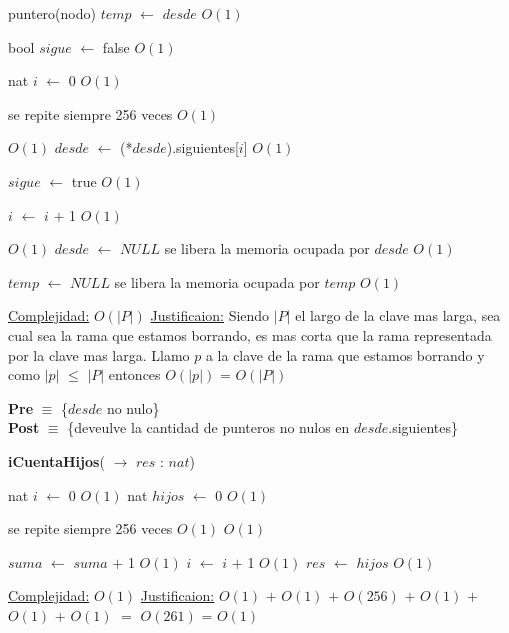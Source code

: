 \begin{Algoritmos}
\begin{algorithm}[H]
\begin{algorithmic}[1]
	\State puntero(nodo) $temp$ $\gets$ $desde$ \Comment $O(1)$

	\State bool $sigue$ $\gets$ false \Comment $O(1)$

	\State nat $i$ $\gets$ 0 \State $O(1)$

	 \Comment se repite siempre 256 veces $O(1)$

		 \Comment $O(1)$
			\State $desde$ $\gets$ (*$desde$).siguientes[$i$] \Comment $O(1)$		
		
			\State $sigue$ $\gets$ true \Comment $O(1)$		
		
		\EndIf
		\State $i$ $\gets$ $i$ $+$ 1 \Comment $O(1)$

	\EndWhile

\EndWhile

 \Comment $O(1)$
	\State $desde$ $\gets$ $NULL$ \Comment se libera la memoria ocupada por $desde$ $O(1)$

\EndIf

\State $temp$ $\gets$ $NULL$ \Comment se libera la memoria ocupada por $temp$ $O(1)$


\medskip
\State \underline{Complejidad:} $O(|P|)$
\State \underline{Justificaion:} Siendo $|P|$ el largo de la clave mas larga, sea cual sea la rama que estamos borrando, es mas corta que la rama representada por la clave mas larga. Llamo $p$ a la clave de la rama que estamos borrando y como $|p|$ $\leq$ $|P|$ entonces $O(|p|)$ = $O(|P|)$ 

\end{algorithmic}
\end{algorithm}
  
 

\textbf{Pre} $\equiv$ \{$desde$ no nulo\}\\%
\textbf{Post} $\equiv$ \{deveulve la cantidad de punteros no nulos en $desde$.siguientes\}%

\begin{algorithm}[H]
{\textbf{iCuentaHijos}(} $\to$ $res$ : $nat$)
\begin{algorithmic}[1]

\State nat $i$ $\gets$ 0 \Comment $O(1)$
\State nat $hijos$ $\gets$ 0 \Comment $O(1)$

 \Comment se repite siempre 256 veces $O(1)$
	 \State $O(1)$ 
	
	\State $suma$ $\gets$ $suma$ $+$ 1 \Comment $O(1)$
	\State $i$ $\gets$ $i$ $+$ 1 \Comment $O(1)$
	\EndIf
\EndWhile
\State $res$ $\gets$ $hijos$ \Comment $O(1)$


\medskip
\State \underline{Complejidad:} $O(1)$
\State \underline{Justificaion:}  $O(1)$ $+$ $O(1)$ $+$ $O(256)$ $+$ $O(1)$ $+$ $O(1)$ $+$ $O(1)$ $=$ $O(261)$ = $O(1)$

\end{algorithmic}
\end{algorithm}

  
\end{Algoritmos}


